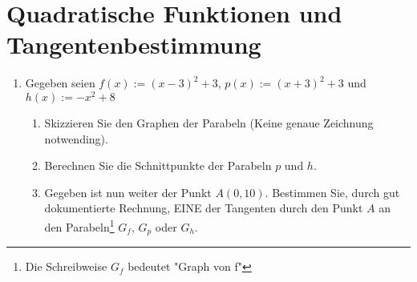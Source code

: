 \documentclass{scrartcl}
\begin{document}
	\section{Quadratische Funktionen und Tangentenbestimmung}
		
	\begin{enumerate}
		\item Gegeben seien $f(x) := (x-3)^2+3$, $p(x) := (x+3)^2+3$ und $h(x) := -x^2+8$
		\begin{enumerate}
			\item Skizzieren Sie den Graphen der Parabeln (Keine genaue Zeichnung notwending).
			\item Berechnen Sie die Schnittpunkte der Parabeln $p$ und $h$.
			\item Gegeben ist nun weiter der Punkt $A(0,10)$. Bestimmen Sie, durch gut dokumentierte Rechnung, EINE der Tangenten durch den Punkt $A$ an den Parabeln\footnote{Die Schreibweise $G_f$ bedeutet "Graph von f"} $G_f$, $G_p$ oder $G_h$. \\
		\end{enumerate} %
			
	\end{enumerate} 
	
	
\end{document}
